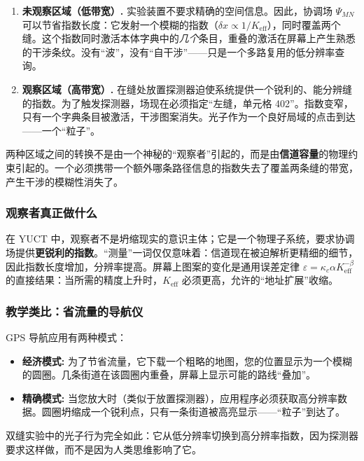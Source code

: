 \documentclass[12pt,a4paper]{article}
\theoremstyle{remark}
\begin{document}
	\begin{enumerate}[leftmargin=*]
		\item \textbf{未观察区域（低带宽）.}
		实验装置不要求精确的空间信息。因此，协调场 $\Psi_{MN}$ 可以节省指数长度：它发射一个模糊的指数（$\delta x \propto 1/K_{\mathrm{eff}}$），同时覆盖两个缝。这个指数同时激活本体字典中的\emph{几个}条目，重叠的激活在屏幕上产生熟悉的干涉条纹。没有“波”，没有“自干涉”——只是一个多路复用的低分辨率查询。
		
		\item \textbf{观察区域（高带宽）.}
		在缝处放置探测器迫使系统提供一个锐利的、能分辨缝的指数。为了触发探测器，场现在必须指定“左缝，单元格 402”。指数变窄，只有一个字典条目被激活，干涉图案消失。光子作为一个良好局域的点击到达——一个“粒子”。
	\end{enumerate}
	
	两种区域之间的转换不是由一个神秘的“观察者”引起的，而是由\textbf{信道容量}的物理约束引起的。一个必须携带一个额外哪条路径信息的指数失去了覆盖两条缝的带宽，产生干涉的模糊性消失了。
	
	\subsubsection{观察者真正做什么}
	
	在 YUCT 中，观察者不是坍缩现实的意识主体；它是一个物理子系统，要求协调场提供\textbf{更锐利的指数}。“测量”一词仅仅意味着：信道现在被迫解析更精细的细节，因此指数长度增加，分辨率提高。屏幕上图案的变化是通用误差定律 $\varepsilon = \kappa_c \alpha K_{\mathrm{eff}}^{-\beta}$ 的直接结果：当所需的精度上升时，$K_{\mathrm{eff}}$ 必须更高，允许的“地址扩展”收缩。
	
	\subsubsection{教学类比：省流量的导航仪}
	
	GPS 导航应用有两种模式：
	\begin{itemize}
		\item \textbf{经济模式:} 为了节省流量，它下载一个粗略的地图，您的位置显示为一个模糊的圆圈。几条街道在该圆圈内重叠，屏幕上显示可能的路线“叠加”。
		\item \textbf{精确模式:} 当您放大时（类似于放置探测器），应用程序必须获取高分辨率数据。圆圈坍缩成一个锐利点，只有一条街道被高亮显示——“粒子”到达了。
	\end{itemize}
	双缝实验中的光子行为完全如此：它从低分辨率切换到高分辨率指数，因为探测器要求这样做，而不是因为人类思维影响了它。
	
\end{document}
